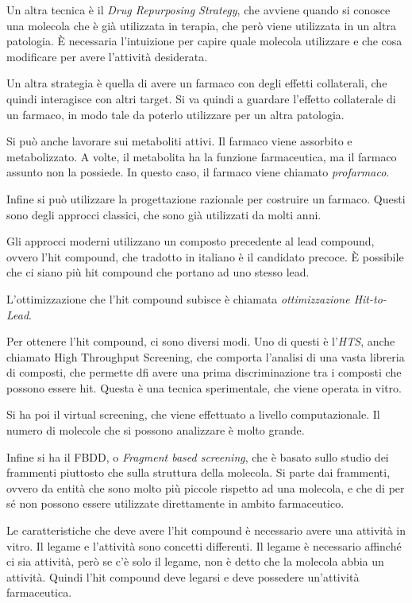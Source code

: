 Un altra tecnica è il \emph{Drug Repurposing Strategy}, che avviene
quando si conosce una molecola che è già utilizzata in terapia, che però
viene utilizzata in un altra patologia. È necessaria l'intuizione per
capire quale molecola utilizzare e che cosa modificare per avere
l'attività desiderata.

Un altra strategia è quella di avere un farmaco con degli effetti
collaterali, che quindi interagisce con altri target. Si va quindi a
guardare l'effetto collaterale di un farmaco, in modo tale da poterlo
utilizzare per un altra patologia.

Si può anche lavorare sui metaboliti attivi. Il farmaco viene assorbito
e metabolizzato. A volte, il metabolita ha la funzione farmaceutica, ma
il farmaco assunto non la possiede. In questo caso, il farmaco viene
chiamato \emph{profarmaco}.

Infine si può utilizzare la progettazione razionale per costruire un
farmaco.
Questi sono degli approcci classici, che sono già utilizzati da molti
anni.

Gli approcci moderni utilizzano un composto precedente al lead compound,
ovvero l'hit compound, che tradotto in italiano è il candidato precoce.
È possibile che ci siano più hit compound che portano ad uno stesso
lead.

L'ottimizzazione che l'hit compound subisce è chiamata
\emph{ottimizzazione Hit-to-Lead}.

Per ottenere l'hit compound, ci sono diversi modi. Uno di questi è
l'\emph{HTS}, anche chiamato High Throughput Screening, che comporta
l'analisi di una vasta libreria di composti, che permette dfi avere una
prima discriminazione tra i composti che possono essere hit. Questa è
una tecnica sperimentale, che viene operata in vitro.

Si ha poi il virtual screening, che viene effettuato a livello
computazionale. Il numero di molecole che si possono analizzare è molto
grande.

Infine si ha il FBDD, o \emph{Fragment based screening}, che è basato sullo
studio dei frammenti piuttosto che sulla struttura della molecola. Si
parte dai frammenti, ovvero da entità che sono molto più piccole
rispetto ad una molecola, e che di per sé non possono essere utilizzate
direttamente in ambito farmaceutico.


Le caratteristiche che deve avere l'hit compound è necessario avere una
attività in vitro.
Il legame e l'attività sono concetti differenti. Il legame è necessario
affinché ci sia attività, però se c'è solo il legame, non è detto che la
molecola abbia un attività. Quindi l'hit compound deve legarsi e deve
possedere un'attività farmaceutica.

